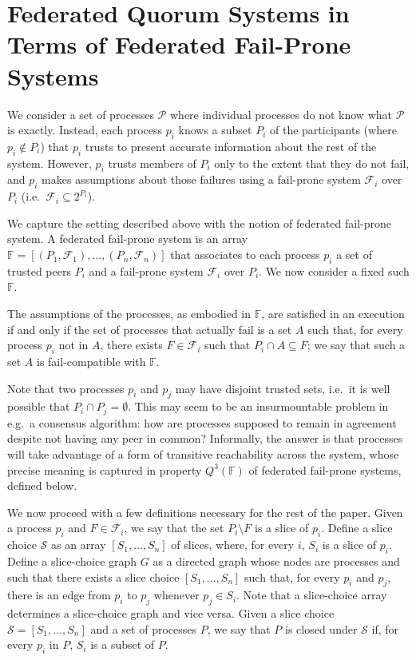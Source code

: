 \documentclass[11pt]{article}
\begin{document}
\section{Federated Quorum Systems in Terms of Federated Fail-Prone Systems}

We consider a set of processes $\mathcal{P}$ where individual processes do not know what $\mathcal{P}$ is exactly.
Instead, each process $p_i$ knows a subset $P_i$ of the participants (where $p_i\not\in P_i$) that $p_i$ trusts to present accurate information about the rest of the system.
However, $p_i$ trusts members of $P_i$ only to the extent that they do not fail, and $p_i$ makes assumptions about those failures using a fail-prone system $\mathcal{F}_i$ over $P_i$ (i.e.\ $\mathcal{F}_i\subseteq 2^{P_i}$).

We capture the setting described above with the notion of federated fail-prone system. A federated fail-prone system is an array $\mathbb{F}=\left[\left(P_1,\mathcal{F}_1\right),...,\left(P_n,\mathcal{F}_n\right)\right]$ that associates to each process $p_i$ a set of trusted peers $P_i$ and a fail-prone system $\mathcal{F}_i$ over $P_i$. %
We now consider a fixed such $\mathbb{F}$.

The assumptions of the processes, as embodied in $\mathbb{F}$, are satisfied in an execution if and only if the set of processes that actually fail is a set $A$ such that, for every process $p_i$ not in $A$, there exists $F\in\mathcal{F}_i$ such that $P_i\cap A \subseteq F$; we say that such a set $A$ is fail-compatible with $\mathbb{F}$.

Note that two processes $p_i$ and $p_j$ may have disjoint trusted sets, i.e.\ it is well possible that $P_i\cap P_j=\emptyset$. This may seem to be an insurmountable problem in e.g.\ a consensus algorithm: how are processes supposed to remain in agreement despite not having any peer in common? Informally, the answer is that processes will take advantage of a form of transitive reachability across the system, whose precise meaning is captured in property $Q^3(\mathbb{F})$ of federated fail-prone systems, defined below.

We now proceed with a few definitions necessary for the rest of the paper.
Given a process $p_i$ and $F\in \mathcal{F}_i$, we say that the set $P_i\setminus F$ is a slice of $p_i$.
Define a slice choice $\mathcal{S}$ as an array $\left[S_1,...,S_n\right]$ of slices, where, for every $i$, $S_i$ is a slice of $p_i$.
Define a slice-choice graph $G$ as a directed graph whose nodes are processes and such that there exists a slice choice $\left[S_1,...,S_n\right]$ such that, for every $p_i$ and $p_j$, there is an edge from $p_i$ to $p_j$ whenever $p_j\in S_i$. Note that a slice-choice array determines a slice-choice graph and vice versa.
Given a slice choice $\mathcal{S}=\left[S_1,...,S_n\right]$ and a set of processes $P$, we say that $P$ is closed under $\mathcal{S}$ if, for every $p_i$ in $P$, $S_i$ is a subset of $P$.
\end{document}
